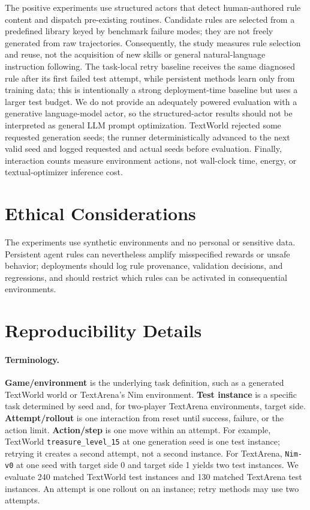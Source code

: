 \documentclass[11pt]{article}
\begin{document}
The positive experiments use structured actors that detect human-authored rule content and dispatch pre-existing routines.
Candidate rules are selected from a predefined library keyed by benchmark failure modes; they are not freely generated from raw trajectories.
Consequently, the study measures rule selection and reuse, not the acquisition of new skills or general natural-language instruction following.
The task-local retry baseline receives the same diagnosed rule after its first failed test attempt, while persistent methods learn only from training data; this is intentionally a strong deployment-time baseline but uses a larger test budget.
We do not provide an adequately powered evaluation with a generative language-model actor, so the structured-actor results should not be interpreted as general LLM prompt optimization.
TextWorld rejected some requested generation seeds; the runner deterministically advanced to the next valid seed and logged requested and actual seeds before evaluation.
Finally, interaction counts measure environment actions, not wall-clock time, energy, or textual-optimizer inference cost.

\section*{Ethical Considerations}

The experiments use synthetic environments and no personal or sensitive data.
Persistent agent rules can nevertheless amplify misspecified rewards or unsafe behavior; deployments should log rule provenance, validation decisions, and regressions, and should restrict which rules can be activated in consequential environments.



\appendix
\section{Reproducibility Details}

\paragraph{Terminology.}
\textbf{Game/environment} is the underlying task definition, such as a generated TextWorld world or TextArena's Nim environment.
\textbf{Test instance} is a specific task determined by seed and, for two-player TextArena environments, target side.
\textbf{Attempt/rollout} is one interaction from reset until success, failure, or the action limit.
\textbf{Action/step} is one move within an attempt.
For example, TextWorld \texttt{treasure\_level\_15} at one generation seed is one test instance; retrying it creates a second attempt, not a second instance.
For TextArena, \texttt{Nim-v0} at one seed with target side 0 and target side 1 yields two test instances.
We evaluate 240 matched TextWorld test instances and 130 matched TextArena test instances.
An attempt is one rollout on an instance; retry methods may use two attempts.
\end{document}
